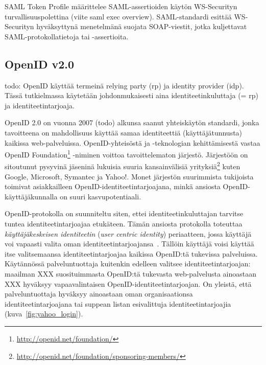 \documentclass[finnish,gradu]{tktltiki}
\begin{document}
  SAML Token Profile määrittelee SAML-assertioiden käytön WS-Securityn turvallisuuspolettina (viite saml exec overview).
  SAML-standardi esittää WS-Securityn hyväksyttynä menetelmänä suojata SOAP-viestit, jotka kuljettavat SAML-protokollatietoja tai -assertioita.





  \subsection{OpenID v2.0} %
  \label{sub:openid}

  todo: OpenID käyttää termeinä relying party (rp) ja identity provider (idp). Tässä tutkielmassa käytetään johdonmukaisesti aina identiteetinkuluttaja (= rp) ja identiteetintarjoaja.

  OpenID 2.0 on vuonna 2007 (todo) alkunsa saanut yhteiskäytön standardi, jonka tavoitteena on mahdollisuus käyttää samaa identiteettiä (käyttäjätunnusta) kaikissa web-palveluissa. OpenID-yhteisöstä ja -teknologian kehittämisestä vastaa OpenID Foundation\footnote{\url{http://openid.net/foundation/}} -niminen voittoa tavoittelematon järjestö. Järjestöön on sitoutunut pysyvinä jäseninä lukuisia suuria kansainvälisiä yrityksiä\footnote{\url{http://openid.net/foundation/sponsoring-members/}} kuten Google, Microsoft, Symantec ja Yahoo!. Monet järjestön suurimmista tukijoista toimivat asiakkailleen OpenID-identiteetintarjoajana, minkä ansiosta OpenID-käyttäjäkunnalla on suuri kasvupotentiaali.

  OpenID-protokolla on suunniteltu siten, ettei identiteetinkuluttajan tarvitse tuntea identiteetintarjoajaa etukäteen. Tämän ansiosta protokolla toteuttaa \emph{käyttäjäkeskeisen identiteetin} (\emph{user centric identity}) periaatteen, jossa käyttäjä voi vapaasti valita oman identiteetintarjoajansa~\cite{openid_recordon_2009}. Tällöin käyttäjä voisi käyttää itse valitsemaansa identiteetintarjoajaa kaikissa OpenID:tä tukevissa palveluissa. Käytännössä palveluntuottaja kuitenkin edelleen valitsee identiteetintarjoajan: maailman XXX suosituimmasta OpenID:tä tukevasta web-palvelusta ainoastaan XXX hyväksyy vapaavalintaisen OpenID-identiteetintarjoajan. On yleistä, että palveluntuottaja hyväksyy ainoastaan oman organisaationsa identiteetintarjoajana tai suppean listan esivalittuja identiteetintarjoajia (kuva~\ref{fig:yahoo_login}).
\end{document}
